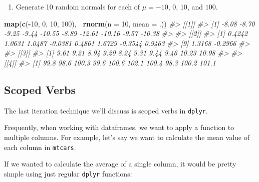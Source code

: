 \documentclass[]{book}
\newenvironment{Shaded}{\begin{snugshade}}{\end{snugshade}}
\newcommand{\KeywordTok}[1]{\textcolor[rgb]{0.13,0.29,0.53}{\textbf{#1}}}
\newcommand{\DataTypeTok}[1]{\textcolor[rgb]{0.13,0.29,0.53}{#1}}
\newcommand{\DecValTok}[1]{\textcolor[rgb]{0.00,0.00,0.81}{#1}}
\newcommand{\StringTok}[1]{\textcolor[rgb]{0.31,0.60,0.02}{#1}}
\newcommand{\CommentTok}[1]{\textcolor[rgb]{0.56,0.35,0.01}{\textit{#1}}}
\newcommand{\OperatorTok}[1]{\textcolor[rgb]{0.81,0.36,0.00}{\textbf{#1}}}
\newcommand{\NormalTok}[1]{#1}
\providecommand{\tightlist}{%
  \setlength{\itemsep}{0pt}\setlength{\parskip}{0pt}}
\begin{document}
\begin{enumerate}
\def\labelenumi{\arabic{enumi}.}
\setcounter{enumi}{2}
\tightlist
\item
  Generate 10 random normals for each of \(\mu = -10\), \(0\), \(10\),
  and \(100\).
\end{enumerate}

\begin{Shaded}
\begin{Highlighting}[]
\KeywordTok{map}\NormalTok{(}\KeywordTok{c}\NormalTok{(}\OperatorTok{-}\DecValTok{10}\NormalTok{, }\DecValTok{0}\NormalTok{, }\DecValTok{10}\NormalTok{, }\DecValTok{100}\NormalTok{), }\OperatorTok{~}\KeywordTok{rnorm}\NormalTok{(}\DataTypeTok{n =} \DecValTok{10}\NormalTok{, }\DataTypeTok{mean =}\NormalTok{ .))}
\CommentTok{#> [[1]]}
\CommentTok{#>  [1]  -8.08  -8.70  -9.25  -9.44 -10.55  -8.89 -12.61 -10.16  -9.57 -10.38}
\CommentTok{#> }
\CommentTok{#> [[2]]}
\CommentTok{#>  [1]  0.4242  1.0631  1.0487 -0.0381  0.4861  1.6729 -0.3544  0.9463}
\CommentTok{#>  [9]  1.3168 -0.2966}
\CommentTok{#> }
\CommentTok{#> [[3]]}
\CommentTok{#>  [1]  9.61  9.21  8.94  9.20  8.24  9.31  9.44  9.46 10.23 10.98}
\CommentTok{#> }
\CommentTok{#> [[4]]}
\CommentTok{#>  [1]  99.8  98.6 100.3  99.6 100.6 102.1 100.4  98.3 100.2 101.1}
\end{Highlighting}
\end{Shaded}

\subsection{Scoped Verbs}\label{scoped-verbs}

The last iteration technique we'll discuss is scoped verbs in
\texttt{dplyr}.

Frequently, when working with dataframes, we want to apply a function to
multiple columns. For example, let's say we want to calculate the mean
value of each column in \texttt{mtcars}.

If we wanted to calculate the average of a single column, it would be
pretty simple using just regular \texttt{dplyr} functions:

\begin{Shaded}
\end{Shaded}
\end{document}
